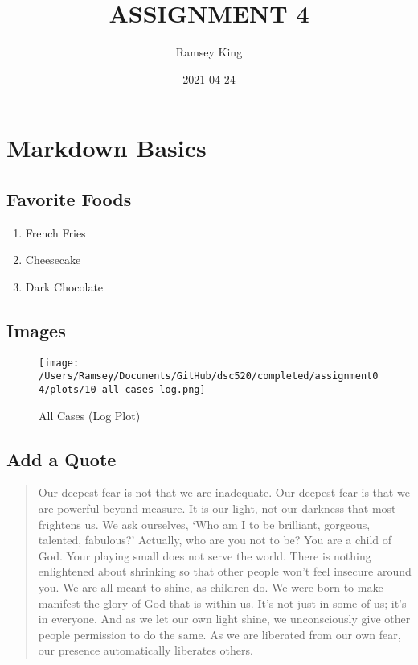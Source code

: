 \documentclass[
]{article}
\title{ASSIGNMENT 4}
\author{Ramsey King}
\date{2021-04-24}
\providecommand{\tightlist}{%
  \setlength{\itemsep}{0pt}\setlength{\parskip}{0pt}}
\begin{document}
\maketitle

\hypertarget{markdown-basics}{%
\section{Markdown Basics}\label{markdown-basics}}

\hypertarget{favorite-foods}{%
\subsection{Favorite Foods}\label{favorite-foods}}

\begin{enumerate}
\def\labelenumi{\arabic{enumi}.}
\tightlist
\item
  French Fries
\item
  Cheesecake
\item
  Dark Chocolate
\end{enumerate}

\hypertarget{images}{%
\subsection{Images}\label{images}}

\begin{figure}
\centering
\texttt{[image: /Users/Ramsey/Documents/GitHub/dsc520/completed/assignment04/plots/10-all-cases-log.png]}
\caption{All Cases (Log Plot)}
\end{figure}

\hypertarget{add-a-quote}{%
\subsection{Add a Quote}\label{add-a-quote}}

\begin{quote}
Our deepest fear is not that we are inadequate. Our deepest fear is that
we are powerful beyond measure. It is our light, not our darkness that
most frightens us. We ask ourselves, `Who am I to be brilliant,
gorgeous, talented, fabulous?' Actually, who are you not to be? You are
a child of God. Your playing small does not serve the world. There is
nothing enlightened about shrinking so that other people won't feel
insecure around you. We are all meant to shine, as children do. We were
born to make manifest the glory of God that is within us. It's not just
in some of us; it's in everyone. And as we let our own light shine, we
unconsciously give other people permission to do the same. As we are
liberated from our own fear, our presence automatically liberates
others.
\end{quote}
\end{document}
